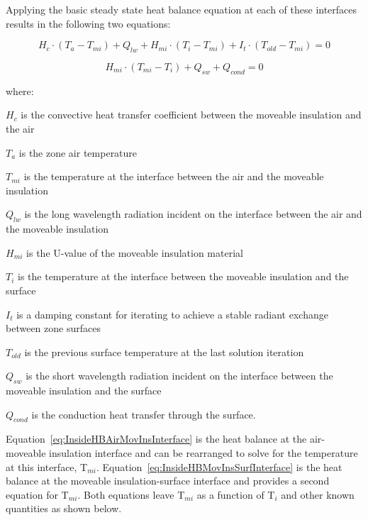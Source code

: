 Applying the basic steady state heat balance equation at each of these interfaces results in the following two equations:

\begin{equation}
H_c \cdot \left( T_a - T_{mi} \right) + Q_{lw} + H_{mi} \cdot  \left( T_i - T_{mi} \right) + I_t \cdot  \left( T_{old} - T_{mi} \right) = 0
\label{eq:InsideHBAirMovInsInterface}
\end{equation}

\begin{equation}
H_{mi} \cdot \left( T_{mi} - T_i \right) + Q_{sw} + Q_{cond} = 0
\label{eq:InsideHBMovInsSurfInterface}
\end{equation}

where:

\(H_c\) is the convective heat transfer coefficient between the moveable insulation and the air

\(T_a\) is the zone air temperature

\(T_{mi}\) is the temperature at the interface between the air and the moveable insulation

\(Q_{lw}\) is the long wavelength radiation incident on the interface between the air and the moveable insulation

\(H_{mi}\) is the U-value of the moveable insulation material

\(T_i\) is the temperature at the interface between the moveable insulation and the surface

\(I_t\) is a damping constant for iterating to achieve a stable radiant exchange between zone surfaces

\(T_{old}\) is the previous surface temperature at the last solution iteration

\(Q_{sw}\) is the short wavelength radiation incident on the interface between the moveable insulation and the surface

\(Q_{cond}\) is the conduction heat transfer through the surface.

Equation~\ref{eq:InsideHBAirMovInsInterface} is the heat balance at the air-moveable insulation interface and can be rearranged to solve for the temperature at this interface, T\(_{mi}\).  Equation~\ref{eq:InsideHBMovInsSurfInterface} is the heat balance at the moveable insulation-surface interface and provides a second equation for T\(_{mi}\).  Both equations leave T\(_{mi}\) as a function of T\(_{i}\) and other known quantities as shown below.

